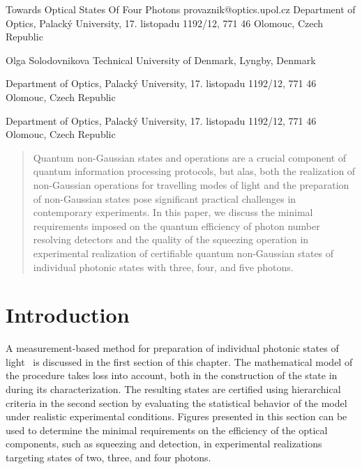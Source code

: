 \documentclass{article}
\begin{document}
\ArticleTitle
  {Towards Optical States Of Four Photons}
  {provaznik@optics.upol.cz}
\ArticleAuthorAddress
  {Department of Optics, Palack\'{y} University, 17. listopadu 1192/12, 771 46 Olomouc, Czech Republic}

\ArticleAuthor
  {Olga Solodovnikova}
\ArticleAuthorAddress
  {Technical University of Denmark, Lyngby, Denmark}

\ArticleAuthorAddress
  {Department of Optics, Palack\'{y} University, 17. listopadu 1192/12, 771 46 Olomouc, Czech Republic}

\ArticleAuthorAddress
  {Department of Optics, Palack\'{y} University, 17. listopadu 1192/12, 771 46 Olomouc, Czech Republic}

\ArticleTitlePrint

\begin{abstract}\noindent
  Quantum non-Gaussian states and operations are a crucial component of quantum information processing protocols, but alas, both the realization of non-Gaussian operations for travelling modes of light and the preparation of non-Gaussian states pose significant practical challenges in contemporary experiments. In this paper, we discuss the minimal requirements imposed on the quantum efficiency of photon number resolving detectors and the quality of the squeezing operation in experimental realization of certifiable quantum non-Gaussian states of individual photonic states with three, four, and five photons.
\end{abstract}

%
%

\section{Introduction}

A measurement-based method for preparation of individual photonic states of light~\cite{yukawa2013a,yoshikawa2018,tiedau2019,provaznik2020} is discussed in the first section of this chapter. The mathematical model of the procedure takes loss into account, both in the construction of the state in during its characterization. The resulting states are certified using hierarchical criteria \cite{lachman2019} in the second section by evaluating the statistical behavior of the model under realistic experimental conditions. Figures presented in this section can be used to determine the minimal requirements on the efficiency of the optical components, such as squeezing and detection, in experimental realizations targeting states of two, three, and four photons.
\end{document}
